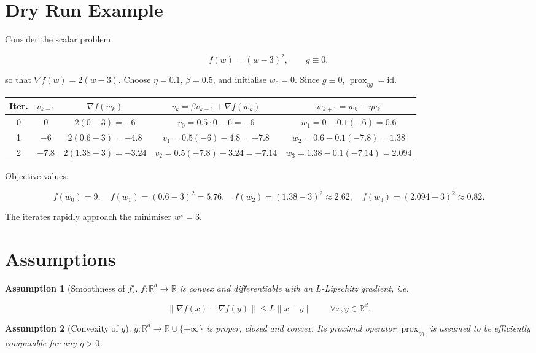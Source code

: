 \documentclass{article}
\newtheorem{assumption}{Assumption}
\newcommand{\prox}{\operatorname{prox}}
\begin{document}
\section*{Dry Run Example}
Consider the scalar problem  

\[
f(w)=(w-3)^{2},\qquad g\equiv0,
\]

so that \(\nabla f(w)=2(w-3)\).  
Choose \(\eta=0.1\), \(\beta=0.5\), and initialise \(w_{0}=0\).  
Since \(g\equiv0\), \(\prox_{\eta g}= \text{id}\).

\begin{center}
\begin{tabular}{c|c|c|c|c}
\textbf{Iter.} & \(v_{k-1}\) & \(\nabla f(w_k)\) & \(v_k=\beta v_{k-1}+\nabla f(w_k)\) & \(w_{k+1}=w_k-\eta v_k\)\\ \hline
0 & 0 & \(2(0-3)=-6\) & \(v_0=0.5\cdot0-6=-6\) & \(w_1=0-0.1(-6)=0.6\)\\[2mm]
1 & \(-6\) & \(2(0.6-3)=-4.8\) & \(v_1=0.5(-6)-4.8=-7.8\) & \(w_2=0.6-0.1(-7.8)=1.38\)\\[2mm]
2 & \(-7.8\) & \(2(1.38-3)=-3.24\) & \(v_2=0.5(-7.8)-3.24=-7.14\) & \(w_3=1.38-0.1(-7.14)=2.094\)
\end{tabular}
\end{center}

Objective values:  

\[
f(w_0)=9,\quad f(w_1)=(0.6-3)^2=5.76,\quad f(w_2)=(1.38-3)^2\approx2.62,\quad f(w_3)=(2.094-3)^2\approx0.82.
\]

The iterates rapidly approach the minimiser \(w^{\star}=3\).

\section*{Assumptions}
\begin{assumption}[Smoothness of \(f\)]
\(f:\mathbb{R}^{d}\to\mathbb{R}\) is convex and differentiable with an \(L\)-Lipschitz gradient, i.e.  

\[
\|\nabla f(x)-\nabla f(y)\|\le L\|x-y\|\qquad\forall x,y\in\mathbb{R}^{d}.
\tag{A1}
\]
\end{assumption}

\begin{assumption}[Convexity of \(g\)]
\(g:\mathbb{R}^{d}\to\mathbb{R}\cup\{+\infty\}\) is proper, closed and convex. Its proximal operator \(\prox_{\eta g}\) is assumed to be efficiently computable for any \(\eta>0\).
\end{assumption}
\end{document}
